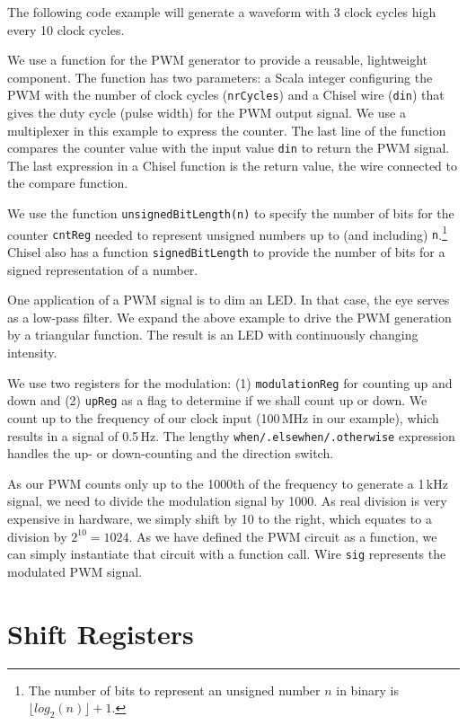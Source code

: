 \documentclass[%
    10pt,
    headinclude, footexclude,
    openright, %
    notitlepage,
    cleardoubleempty,
    headsepline,
    pointlessnumbers,
    bibtotoc, idxtotoc,
    ]{scrbook}
\newcommand{\code}[1]{{\lstinline[basicstyle=\small\ttfamily]{#1}}}
\begin{document}
The following code example will generate a waveform with 3 clock cycles high every 10 clock cycles.


\noindent We use a function for the PWM generator to provide a reusable, lightweight component.
The function has two parameters: a Scala integer configuring the PWM with the number of
clock cycles (\code{nrCycles}) and a Chisel wire (\code{din}) that gives the duty cycle (pulse width) for the
PWM output signal. We use a multiplexer in this
example to express the counter. The last line of the function compares the counter value
with the input value \code{din} to return the PWM signal. The last expression in a Chisel function
is the return value, the wire connected to the compare function.

We use the function \code{unsignedBitLength(n)} to specify the number of bits for the counter
\code{cntReg} needed to represent unsigned numbers up to (and including)
\code{n}.\footnote{The number of bits to represent an unsigned number $n$ in binary is $\lfloor log_2(n) \rfloor + 1$.}
Chisel also has a function \code{signedBitLength} to provide the number of bits
for a signed representation of a number.


One application of a PWM signal is to dim an LED. In that case, the eye serves as a low-pass
filter. We expand the above example to drive the PWM generation by a triangular function.
The result is an LED with continuously changing intensity.


We use two registers for the modulation: (1) \code{modulationReg} for counting up and down
and (2) \code{upReg} as a flag to determine if we shall count up or down. We count up
to the frequency of our clock input (100\,MHz in our example), which results in a signal
of 0.5\,Hz. The lengthy \code{when/.elsewhen/.otherwise} expression handles the up- or
down-counting and the direction switch.

As our PWM counts only up to the 1000th of the frequency to generate a 1\,kHz signal,
we need to divide the modulation signal by 1000. As real division is very expensive in hardware,
we simply shift by 10 to the right, which equates to a division by $2^{10} = 1024$.
As we have defined the PWM circuit as a function, we can simply instantiate that circuit
with a function call. Wire \code{sig} represents the modulated PWM signal.

\section{Shift Registers}
\end{document}

